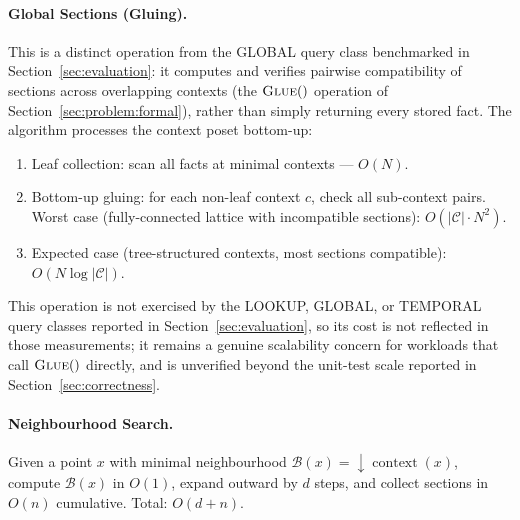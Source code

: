\paragraph{Global Sections (Gluing).} This is a distinct operation from the
GLOBAL query class benchmarked in Section~\ref{sec:evaluation}: it computes
and verifies pairwise compatibility of sections across overlapping contexts
(the $\textsc{Glue}()$ operation of Section~\ref{sec:problem:formal}), rather
than simply returning every stored fact. The algorithm processes the context
poset bottom-up:
\begin{enumerate}
    \item Leaf collection: scan all facts at minimal contexts --- $O(N)$.
    \item Bottom-up gluing: for each non-leaf context $c$, check all
          sub-context pairs. Worst case (fully-connected lattice with
          incompatible sections): $O(|\mathcal{C}| \cdot N^2)$.
    \item Expected case (tree-structured contexts, most sections compatible):
          $O(N \log |\mathcal{C}|)$.
\end{enumerate}
This operation is not exercised by the LOOKUP, GLOBAL, or TEMPORAL query
classes reported in Section~\ref{sec:evaluation}, so its cost is not
reflected in those measurements; it remains a genuine scalability concern
for workloads that call $\textsc{Glue}()$ directly, and is unverified beyond
the unit-test scale reported in Section~\ref{sec:correctness}.

\paragraph{Neighbourhood Search.} Given a point $x$ with minimal neighbourhood
$\mathcal{B}(x) = \downarrow \operatorname{context}(x)$, compute $\mathcal{B}(x)$ in $O(1)$,
expand outward by $d$ steps, and collect sections in $O(n)$ cumulative.
Total: $O(d + n)$.

